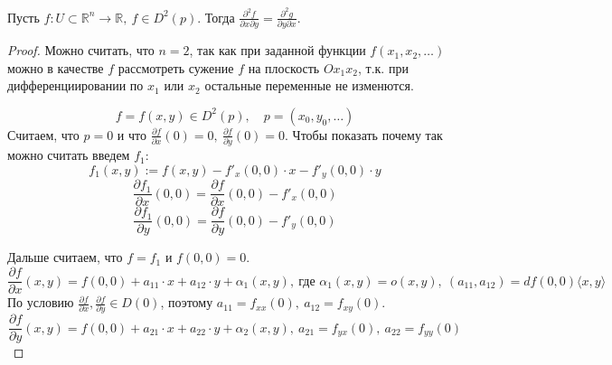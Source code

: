 \begin{theorem}
    Пусть $f:U \subset \mathbb{R}^n \to \mathbb{R}, \ f \in D^2(p)$. Тогда $\frac{\partial^2 f}{\partial x \partial y} = \frac{\partial^2 g}{\partial y \partial x}$.
    \begin{proof}
        Можно считать, что $n = 2$, так как при заданной функции $f(x_1, x_2, \dots)$ можно в качестве $f$ рассмотреть 
        сужение $f$ на плоскость $Ox_1x_2$, т.к. при дифференциировании по $x_1$ или $x_2$ остальные переменные не изменются.

        \[f = f(x, y) \in D^2(p), \quad p = (x_0, y_0, \dots)\]
        Считаем, что $p = 0$ и что $\frac{\partial f}{\partial x}(0) = 0, \ \frac{\partial f}{\partial y}(0) = 0$.
        Чтобы показать почему так можно считать введем $f_1$:
        \[f_1(x, y) := f(x,y) - f'_x(0, 0)\cdot x - f'_y(0,0)\cdot y\]
        \[\frac{\partial f_1}{\partial x}(0, 0) = \frac{\partial f}{\partial x}(0, 0) - f'_x(0,0)\]
        \[\frac{\partial f_1}{\partial y}(0,0) = \frac{\partial f}{\partial y}(0,0) - f'_y(0,0)\]
        
        Дальше считаем, что $f = f_1$ и $f(0,0) = 0$. 
        \begin{equation*}
            \frac{\partial f}{\partial x }(x, y) =f(0,0) + a_{11}\cdot x + a_{12}\cdot y + \alpha_1(x, y), \ \text{где }
            \alpha_1(x, y) = o(x, y), \ (a_{11}, a_{12}) = df(0,0)\langle x, y \rangle
        \end{equation*}
        По условию $\frac{\partial f}{\partial x}, \frac{\partial f}{\partial y} \in D(0)$, поэтому 
        $a_{11} = f_{xx}(0), \ a_{12} = f_{xy}(0)$.
        \[\frac{\partial f}{\partial y}(x, y) = f(0,0) + a_{21}\cdot x + a_{22}\cdot y + \alpha_2(x, y), \ 
        a_{21} = f_{yx}(0), \ a_{22} = f_{yy}(0)\]


\end{proof}
\end{theorem}

